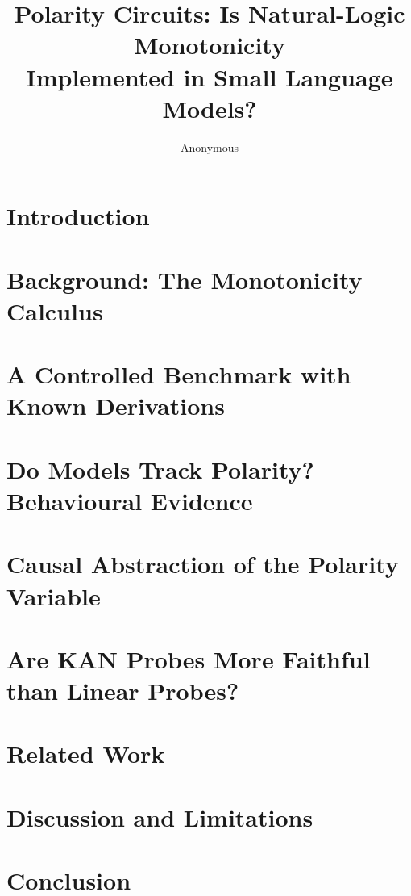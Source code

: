 \documentclass[11pt]{article}
\title{Polarity Circuits: Is Natural-Logic Monotonicity\\Implemented in Small Language Models?}
\author{Anonymous}
\date{}
\begin{document}
\maketitle

\begin{abstract}
\end{abstract}

\section{Introduction}

\section{Background: The Monotonicity Calculus}

\section{A Controlled Benchmark with Known Derivations}

\section{Do Models Track Polarity? Behavioural Evidence}

\section{Causal Abstraction of the Polarity Variable}

\section{Are KAN Probes More Faithful than Linear Probes?}

\section{Related Work}

\section{Discussion and Limitations}

\section{Conclusion}


\end{document}
